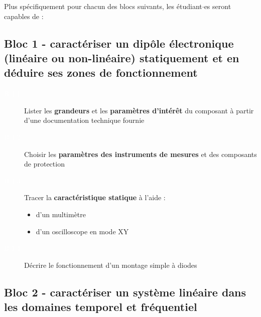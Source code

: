 \documentclass[a4paper,11pt,twoside]{book} %
\begin{document}
{Plus spécifiquement pour chacun des blocs suivants, les étudiant$\cdot$es seront capables de :

\subsection{Bloc 1 - caractériser un dipôle électronique (linéaire ou non-linéaire) statiquement et en déduire ses zones de fonctionnement}

\begin{description}
	\item[\colorbox{violet_iogs!70}{\textcolor{white}{B 1.1}}] Lister les \textbf{grandeurs} et les \textbf{paramètres d'intérêt} du composant à partir d'une documentation technique fournie
	\item[\colorbox{violet_iogs!70}{\textcolor{white}{B 1.2}}] Choisir les \textbf{paramètres des instruments de mesures} et des composants de protection
	\item[\colorbox{violet_iogs!70}{\textcolor{white}{B 1.3}}] Tracer la \textbf{caractéristique statique} à l'aide :
	\begin{itemize}
		\item d'un multimètre
		\item d'un oscilloscope en mode XY
	\end{itemize}
	\item[\colorbox{violet_iogs!70}{\textcolor{white}{B 1.4}}] Décrire le fonctionnement d'un montage simple à diodes
\end{description}

\subsection{Bloc 2 - caractériser un système linéaire dans les domaines temporel et fréquentiel}

}
\end{document}
